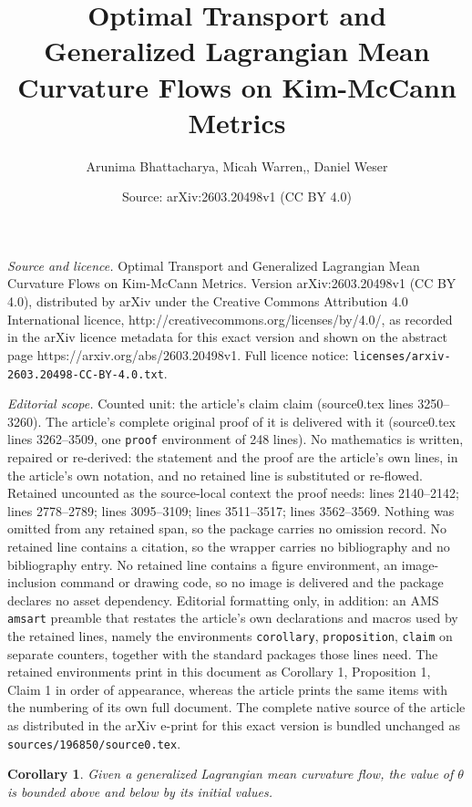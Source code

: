 \documentclass[10pt,a4paper]{amsart}
\title{Optimal Transport and Generalized Lagrangian Mean Curvature Flows on Kim-McCann Metrics}
\author{Arunima Bhattacharya, Micah Warren,, Daniel Weser}
\date{Source: arXiv:2603.20498v1 (CC BY 4.0)}
\newtheorem{corollary}{Corollary}
\begin{document}
\maketitle

\noindent\emph{Source and licence.} Optimal Transport and Generalized Lagrangian Mean Curvature Flows on Kim-McCann Metrics. Version arXiv:2603.20498v1 (CC BY 4.0), distributed by arXiv under the Creative Commons Attribution 4.0 International licence, http://creativecommons.org/licenses/by/4.0/, as recorded in the arXiv licence metadata for this exact version and shown on the abstract page https://arxiv.org/abs/2603.20498v1. Full licence notice: \texttt{licenses/arxiv-2603.20498-CC-BY-4.0.txt}.\par\smallskip

\noindent\textit{Editorial scope.} Counted unit: the article's claim claim (source0.tex lines 3250--3260). The article's complete original proof of it is delivered with it (source0.tex lines 3262--3509, one \texttt{proof} environment of 248 lines). No mathematics is written, repaired or re-derived: the statement and the proof are the article's own lines, in the article's own notation, and no retained line is substituted or re-flowed.  Retained uncounted as the source-local context the proof needs: lines 2140--2142; lines 2778--2789; lines 3095--3109; lines 3511--3517; lines 3562--3569.  Nothing was omitted from any retained span, so the package carries no omission record.  No retained line contains a citation, so the wrapper carries no bibliography and no bibliography entry.  No retained line contains a figure environment, an image-inclusion command or drawing code, so no image is delivered and the package declares no asset dependency.  Editorial formatting only, in addition: an AMS \texttt{amsart} preamble that restates the article's own declarations and macros used by the retained lines, namely the environments \texttt{corollary}, \texttt{proposition}, \texttt{claim} on separate counters, together with the standard packages those lines need.  The retained environments print in this document as Corollary 1, Proposition 1, Claim 1 in order of appearance, whereas the article prints the same items with the numbering of its own full document.  The complete native source of the article as distributed in the arXiv e-print for this exact version is bundled unchanged as \texttt{sources/196850/source0.tex}.
\begin{corollary} \label{thetamaxprinciple}
    Given a generalized Lagrangian mean curvature flow, the value of $\theta$ is bounded above and below by its initial values. 
\end{corollary}
\end{document}

